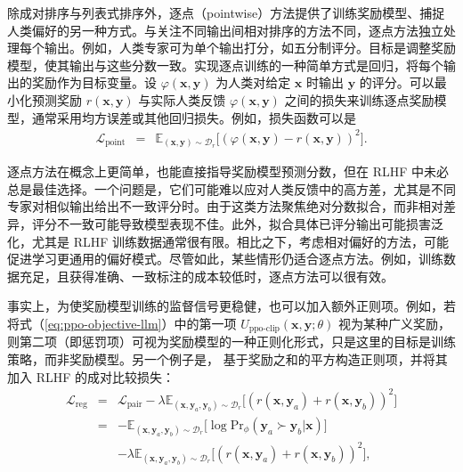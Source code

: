 除成对排序与列表式排序外，逐点（pointwise）方法提供了训练奖励模型、捕捉人类偏好的另一种方式。与关注不同输出间相对排序的方法不同，逐点方法独立处理每个输出。例如，人类专家可为单个输出打分，如五分制评分。目标是调整奖励模型，使其输出与这些分数一致。实现逐点训练的一种简单方式是回归，将每个输出的奖励作为目标变量。设 $\varphi(\mathbf{x},\mathbf{y})$ 为人类对给定 $\mathbf{x}$ 时输出 $\mathbf{y}$ 的评分。可以最小化预测奖励 $r(\mathbf{x},\mathbf{y})$ 与实际人类反馈 $\varphi(\mathbf{x},\mathbf{y})$ 之间的损失来训练逐点奖励模型，通常采用均方误差或其他回归损失。例如，损失函数可以是
\begin{eqnarray}
\mathcal{L}_{\mathrm{point}} & = & \mathbb{E}_{(\mathbf{x},\mathbf{y}) \sim \mathcal{D}_r} \big[ (\varphi(\mathbf{x},\mathbf{y}) - r(\mathbf{x},\mathbf{y}) )^2\big].
\end{eqnarray}

逐点方法在概念上更简单，也能直接指导奖励模型预测分数，但在 RLHF 中未必总是最佳选择。一个问题是，它们可能难以应对人类反馈中的高方差，尤其是不同专家对相似输出给出不一致评分时。由于这类方法聚焦绝对分数拟合，而非相对差异，评分不一致可能导致模型表现不佳。此外，拟合具体已评分输出可能损害泛化，尤其是 RLHF 训练数据通常很有限。相比之下，考虑相对偏好的方法，可能促进学习更通用的偏好模式。尽管如此，某些情形仍适合逐点方法。例如，训练数据充足，且获得准确、一致标注的成本较低时，逐点方法可以很有效。

事实上，为使奖励模型训练的监督信号更稳健，也可以加入额外正则项。例如，若将式（\ref{eq:ppo-objective-llm}）中的第一项 $U_{\mathrm{ppo\text{-}clip}}(\mathbf{x},\mathbf{y};\theta)$ 视为某种广义奖励，则第二项（即惩罚项）可视为奖励模型的一种正则化形式，只是这里的目标是训练策略，而非奖励模型。另一个例子是，\citet{eisenstein-etal:2023helping} 基于奖励之和的平方构造正则项，并将其加入 RLHF 的成对比较损失：
\begin{eqnarray}
\mathcal{L}_{\mathrm{reg}} & = & \mathcal{L}_{\mathrm{pair}} -\lambda \mathbb{E}_{(\mathbf{x},\mathbf{y}_a,\mathbf{y}_b) \sim \mathcal{D}_r} \big[ (r(\mathbf{x},\mathbf{y}_a) + r(\mathbf{x},\mathbf{y}_b) )^2 \big] \nonumber \\
& = & -\mathbb{E}_{(\mathbf{x},\mathbf{y}_a,\mathbf{y}_b) \sim \mathcal{D}_r} \big[ \log \mathrm{Pr}_{\phi}(\mathbf{y}_a \succ \mathbf{y}_b | \mathbf{x}) \big] \nonumber \\
&   & -\lambda  \mathbb{E}_{(\mathbf{x},\mathbf{y}_a,\mathbf{y}_b) \sim \mathcal{D}_r} \big[ (r(\mathbf{x},\mathbf{y}_a) + r(\mathbf{x},\mathbf{y}_b) )^2 \big],
\end{eqnarray}

